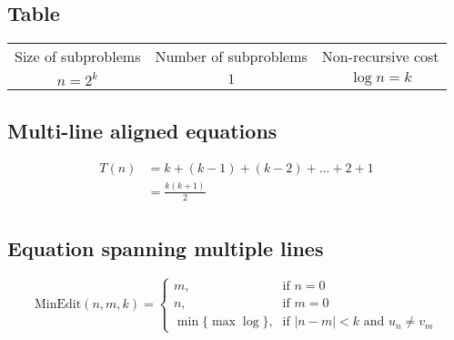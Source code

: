 \documentclass[11pt]{article}
\begin{document}
\subsection{Table}
\begin{center}
\begin{tabular}{ c c c }
 Size of subproblems & Number of subproblems & Non-recursive cost\\ 
 $n = 2^k$ & $1$ & $\log n = k$ \\
\end{tabular}
\end{center}

\subsection{Multi-line aligned equations}

\begin{align*}
T(n) &= k + (k-1) + (k-2) + ... + 2 + 1 \\
&= \frac{k(k+1)}{2} \\
\end{align*}

\subsection{Equation spanning multiple lines}

\[
\text{MinEdit}(n, m, k) = \begin{cases}
\mbox{$m$,} & \mbox{if $n = 0$} \\ \mbox{$n$,} & \mbox{if $m = 0$} \\ \mbox{$\min{\bigg\{\max\log\bigg\}}$,} & \mbox{if $|n - m | < k \text{ and } u_n \neq v_m$}
\end{cases}
\]
\end{document}
